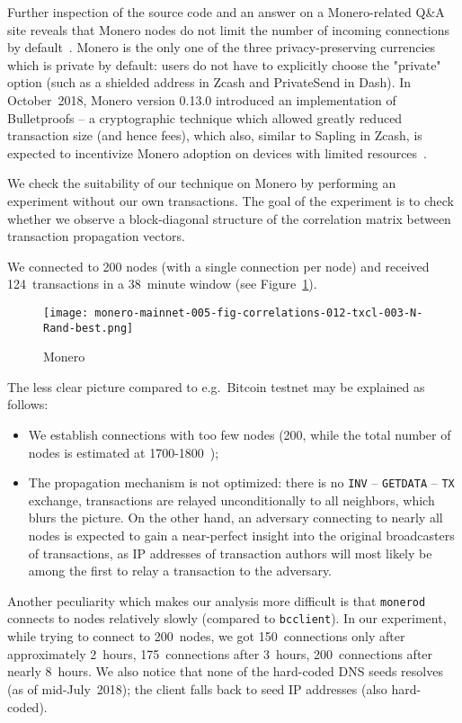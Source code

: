 Further inspection of the source code and an answer on a Monero-related Q\&A site reveals that Monero nodes do not limit the number of incoming connections by default~\cite{user363032016}.
Monero is the only one of the three privacy-preserving currencies which is private by default: users do not have to explicitly choose the "private" option (such as a shielded address in Zcash and PrivateSend in Dash).
In October~2018, Monero version 0.13.0 introduced an implementation of Bulletproofs -- a cryptographic technique which allowed greatly reduced transaction size (and hence fees), which also, similar to Sapling in Zcash, is expected to incentivize Monero adoption on devices with limited resources~\cite{Spagni2018}.

We check the suitability of our technique on Monero by performing an experiment without our own transactions.
The goal of the experiment is to check whether we observe a block-diagonal structure of the correlation matrix between transaction propagation vectors.

We connected to 200 nodes (with a single connection per node) and received 124~transactions in a 38~minute window (see Figure~\ref{fig:monero}).

\begin{figure}[!t]
	\texttt{[image: monero-mainnet-005-fig-correlations-012-txcl-003-N-Rand-best.png]}
	\caption{Monero}
	\label{fig:monero}
\end{figure}

The less clear picture compared to e.g.~Bitcoin testnet may be explained as follows:
\begin{itemize}
	\item We establish connections with too few nodes (200, while the total number of nodes is estimated at 1700-1800~\cite{MoneroHash});
	\item The propagation mechanism is not optimized: there is no \texttt{INV} -- \texttt{GETDATA} -- \texttt{TX} exchange, transactions are relayed unconditionally to all neighbors, which blurs the picture. On the other hand, an adversary connecting to nearly all nodes is expected to gain a near-perfect insight into the original broadcasters of transactions, as IP addresses of transaction authors will most likely be among the first to relay a transaction to the adversary.
\end{itemize}
Another peculiarity which makes our analysis more difficult is that \texttt{monerod} connects to nodes relatively slowly (compared to \texttt{bcclient}).
In our experiment, while trying to connect to 200~nodes, we got 150~connections only after approximately 2~hours, 175~connections after 3~hours, 200~connections after nearly 8~hours.
We also notice that none of the hard-coded DNS seeds resolves (as of mid-July~2018); the client falls back to seed IP addresses (also hard-coded).


